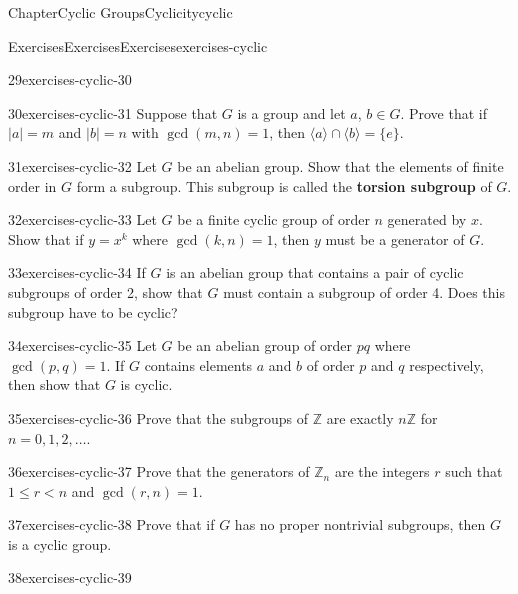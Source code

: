 \documentclass[oneside,10pt,]{book}
\newcommand{\terminology}[1]{\textbf{#1}}
\numberwithin{equation}{section}
\newcommand{\lt}{<}
\begin{document}
\begin{chapterptx}{Chapter}{Cyclic Groups}{}{Cyclicity}{}{}{cyclic}
\begin{exercises-section}{Exercises}{Exercises}{}{Exercises}{}{}{exercises-cyclic}
\begin{divisionexercise}{29}{}{}{exercises-cyclic-30}
\end{divisionexercise}%
\begin{divisionexercise}{30}{}{}{exercises-cyclic-31}%
Suppose that \(G\) is a group and let \(a\), \(b \in G\). Prove that if \(|a| = m\) and \(|b| = n\) with \(\gcd(m,n) = 1\), then \(\langle a \rangle \cap \langle b \rangle  = \{ e \}\).%
\end{divisionexercise}%
\begin{divisionexercise}{31}{}{}{exercises-cyclic-32}%
Let \(G\) be an abelian group. Show that the elements of finite order in \(G\) form a subgroup. This subgroup is called the \terminology{torsion subgroup} of \(G\).%
\end{divisionexercise}%
\begin{divisionexercise}{32}{}{}{exercises-cyclic-33}%
Let \(G\) be a finite cyclic group of order \(n\) generated by \(x\). Show that if \(y = x^k\) where \(\gcd(k,n) = 1\), then \(y\) must be a generator of \(G\).%
\end{divisionexercise}%
\begin{divisionexercise}{33}{}{}{exercises-cyclic-34}%
If \(G\) is an abelian group that contains a pair of cyclic subgroups of order 2, show that \(G\) must contain a subgroup of order 4. Does this subgroup have to be cyclic?%
\end{divisionexercise}%
\begin{divisionexercise}{34}{}{}{exercises-cyclic-35}%
Let \(G\) be an abelian group of order \(pq\) where \(\gcd(p,q) = 1\).  If \(G\) contains elements \(a\) and \(b\) of order \(p\) and \(q\) respectively, then show that \(G\) is cyclic.%
\end{divisionexercise}%
\begin{divisionexercise}{35}{}{}{exercises-cyclic-36}%
Prove that the subgroups of \(\mathbb Z\) are exactly \(n{\mathbb Z}\) for \(n = 0, 1, 2, \ldots\).%
\end{divisionexercise}%
\begin{divisionexercise}{36}{}{}{exercises-cyclic-37}%
Prove that the generators of \({\mathbb Z}_n\) are the integers \(r\) such that \(1 \leq r \lt n\) and \(\gcd(r,n) =  1\).%
\end{divisionexercise}%
\begin{divisionexercise}{37}{}{}{exercises-cyclic-38}%
Prove that if \(G\) has no proper nontrivial subgroups, then \(G\) is a cyclic group.%
\end{divisionexercise}%
\begin{divisionexercise}{38}{}{}{exercises-cyclic-39}%

\end{divisionexercise}
\end{exercises-section}
\end{chapterptx}
\end{document}
